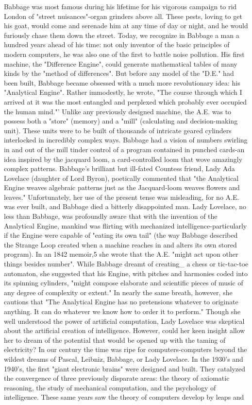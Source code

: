 Babbage was most famous during his lifetime for his vigorous campaign to rid London of "street nuisances"-organ grinders above all. These pests, loving to get his goat, would come and serenade him at any time of day or night, and he would furiously chase them down the street. Today, we recognize in Babbage a man a hundred years ahead of his time: not only inventor of the basic principles of modern computers, he was also one of the first to battle noise pollution. His first machine, the "Difference Engine", could generate mathematical tables of many kinds by the "method of differences". But before any model of the "D.E." had been built, Babbage became obsessed with a much more revolutionary idea: his "Analytical Engine". Rather immodestly, he wrote, "The course through which I arrived at it was the most entangled and perplexed which probably ever occupied the human mind."' Unlike any previously designed machine, the A.E. was to possess both a "store" (memory) and a "mill" (calculating and decision-making unit). These units were to be built of thousands of intricate geared cylinders interlocked in incredibly complex ways. Babbage had a vision of numbers swirling in and out of the mill tinder control of a program contained in punched cards-an idea inspired by the jacquard loom, a card-controlled loom that wove amazingly complex patterns. Babbage's brilliant but ill-fated Countess friend, Lady Ada Lovelace (daughter of Lord Byron), poetically commented that "the Analytical Engine weaves algebraic patterns just as the Jacquard-loom weaves flowers and leaves." Unfortunately, her use of the present tense was misleading, for no A.E. was ever built, and Babbage died a bitterly disappointed man. Lady Lovelace, no less than Babbage, was profoundly aware that with the invention of the Analytical Engine, mankind was flirting with mechanized intelligence-particularly if the Engine were capable of "eating its own tail" (the way Babbage described the Strange Loop created when a machine reaches in and alters its own stored program). In an 1842 memoir,5 she wrote that the A.E. "might act upon other things besides number". While Babbage dreamt of creating_ a chess or tic-tac-toe automaton, she suggested that his Engine, with pitches and harmonies coded into its spinning cylinders, "might compose elaborate and scientific pieces of music of any degree of complexity or extent." In nearly the same breath, however, she cautions that "The Analytical Engine has no pretensions whatever to originate anything. It can do whatever we know how to order it to perform." Though she well understood the power of artificial computation, Lady Lovelace was skeptical about the artificial creation of intelligence. However, could her keen insight allow her to dream of the potential that would be opened up with the taming of electricity? In our century the time was ripe for computers-computers beyond the wildest dreams of Pascal, Leibniz, Babbage, or Lady Lovelace. In the 1930's and 1940's, the first "giant electronic brains" were designed and built. They catalyzed the convergence of three previously disparate areas: the theory of axiomatic reasoning, the study of mechanical computation, and the psychology of intelligence. These same years saw the theory of computers develop by leaps and 
